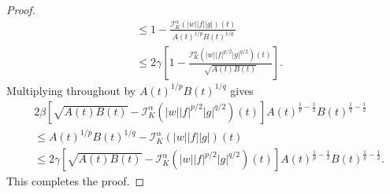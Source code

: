 \documentclass[10pt,a4paper]{amsart}
\begin{document}
\begin{proof}
\[\begin{aligned}
&\leq
1-
\frac{
\mathcal{I}_{K}^{\alpha}(|w||f||g|)(t)
}
{
A(t)^{1/p}B(t)^{1/q}
}                                                         \\
&\leq
2\gamma
\left[
1-
\frac{
\mathcal{I}_{K}^{\alpha}
\left(|w||f|^{p/2}|g|^{q/2}\right)(t)
}
{\sqrt{A(t)B(t)}}
\right].
\end{aligned}
\]
Multiplying throughout by $A(t)^{1/p}B(t)^{1/q}$ gives
\[
\begin{aligned}
&2\beta
\left[
\sqrt{A(t)B(t)}
-
\mathcal{I}_{K}^{\alpha}
\left(|w||f|^{p/2}|g|^{q/2}\right)(t)
\right]
A(t)^{\frac1p-\frac12}
B(t)^{\frac1q-\frac12}                                      \\
&\leq
A(t)^{1/p}B(t)^{1/q}
-
\mathcal{I}_{K}^{\alpha}(|w||f||g|)(t)                       \\
&\leq
2\gamma
\left[
\sqrt{A(t)B(t)}
-
\mathcal{I}_{K}^{\alpha}
\left(|w||f|^{p/2}|g|^{q/2}\right)(t)
\right]
A(t)^{\frac1p-\frac12}
B(t)^{\frac1q-\frac12}.
\end{aligned}
\]
This completes the proof.
\end{proof}
\end{document}
